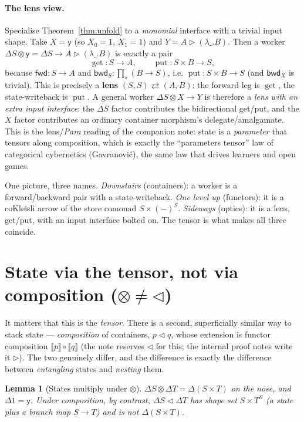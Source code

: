 \documentclass[11pt]{article}
\newcommand{\ctr}{\mathbin{\triangleright}}      %
\newcommand{\ext}[1]{\llbracket #1 \rrbracket}    %
\newcommand{\comp}{\mathbin{\triangleleft}}       %
\newcommand{\fwd}{\mathsf{fwd}}
\newcommand{\bwd}{\mathsf{bwd}}
\newcommand{\y}{\mathsf{y}}
\DeclareMathOperator{\getop}{get}
\DeclareMathOperator{\putop}{put}
\theoremstyle{plain}
\newtheorem{lemma}{Lemma}
\theoremstyle{definition}
\begin{document}
\paragraph{The lens view.} Specialise Theorem~\ref{thm:unfold} to a \emph{monomial} interface with a
trivial input shape. Take $X=\y$ (so $X_0=1$, $X_1=1$) and $Y=A\ctr(\lambda\_.B)$. Then a worker
$\Delta S\otimes\y=\Delta S \to A\ctr(\lambda\_.B)$ is exactly a pair
\[
  \getop : S \to A,
  \qquad
  \putop : S\times B \to S,
\]
because $\fwd:S\to A$ and $\bwd_S : \prod_{s}(B\to S)$, i.e. $\putop:S\times B\to S$ (and $\bwd_X$ is
trivial). This is precisely a \textbf{lens} $(S,S)\rightleftarrows(A,B)$: the forward leg is
$\getop$, the state-writeback is $\putop$. A general worker $\Delta S\otimes X\to Y$ is therefore a
\emph{lens with an extra input interface}: the $\Delta S$ factor contributes the bidirectional
get/put, and the $X$ factor contributes an ordinary container morphism's delegate/amalgamate. This
is the lens/\emph{Para} reading of the companion note: state is a \emph{parameter} that tensors
along composition, which is exactly the ``parameters tensor'' law of categorical cybernetics
(Gavranović), the same law that drives learners and open games.

\begin{deepbox}
One picture, three names. \emph{Downstairs} (containers): a worker is a forward/backward pair with a
state-writeback. \emph{One level up} (functors): it is a coKleisli arrow of the store comonad
$S\times(-)^S$. \emph{Sideways} (optics): it is a lens, get/put, with an input interface bolted on.
The tensor is what makes all three coincide.
\end{deepbox}

\section{State via the tensor, not via composition ($\otimes \neq \comp$)}\label{sec:vs}

It matters that this is the \emph{tensor}. There is a second, superficially similar way to stack
state --- \emph{composition} of containers, $p\comp q$, whose extension is functor composition
$\ext{p}\circ\ext{q}$ (the note reserves $\comp$ for this; the internal proof notes write it
$\triangleright$). The two genuinely differ, and the difference is exactly the difference between
\emph{entangling} states and \emph{nesting} them.

\begin{lemma}[States multiply under $\otimes$]\label{lem:mult}
$\Delta S\otimes\Delta T = \Delta(S\times T)$ on the nose, and $\Delta 1 = \y$. Under
\emph{composition}, by contrast, $\Delta S\comp\Delta T$ has shape set $S\times T^{S}$ (a state
\emph{plus a branch map} $S\to T$) and is not $\Delta(S\times T)$.
\end{lemma}
\end{document}
